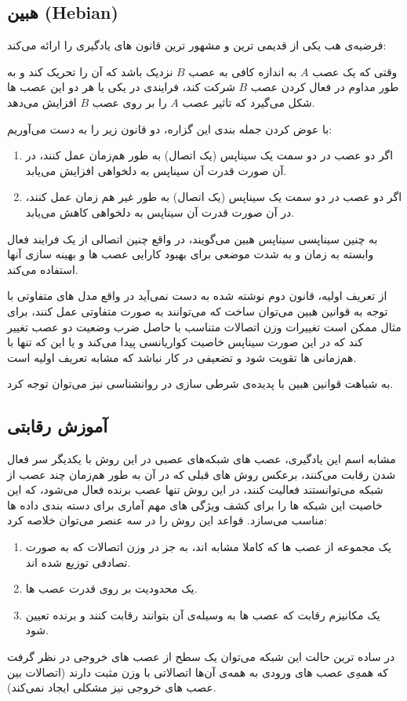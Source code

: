 \documentclass[11pt,a4paper,twocolumn]{article}
\begin{document}
\subsection{هبین (Hebian)}
فرضیه‌ی هب یکی از قدیمی ترین و مشهور ترین قانون های یادگیری را ارائه می‌کند:

وقتی که یک عصب $A$ به اندازه کافی به عصب $B$ نزدیک باشد که آن را تحریک کند و به طور مداوم در فعال کردن عصب $B$ شرکت کند، فرایندی در یکی یا هر دو این عصب ها شکل می‌گیرد که تاثیر عصب $A$ را بر روی عصب $B$ افزایش می‌دهد. \cite[ص-۵۱]{haykin}

با عوض کردن جمله بندی این گزاره، دو قانون زیر را به دست می‌آوریم:
\begin{enumerate}
\item
اگر دو عصب در دو سمت یک سیناپس (یک اتصال) به طور هم‌زمان عمل کنند، در آن صورت قدرت آن سیناپس به دلخواهی افزایش می‌یابد.
\item
اگر دو عصب در دو سمت یک سیناپس (یک اتصال) به طور غیر هم زمان عمل کنند، در آن صورت قدرت آن سیناپس به دلخواهی کاهش می‌یابد. \cite[ص-۵۵]{haykin}
\end{enumerate}
به چنین سیناپسی سیناپس هبین می‌گویند، در واقع چنین اتصالی از یک فرایند فعال وابسته به زمان و به شدت موضعی برای بهبود کارایی عصب ها و بهینه سازی آنها استفاده می‌کند.

از تعریف اولیه، قانون دوم نوشته شده به دست نمی‌آید در واقع مدل های متفاوتی با توجه به قوانین هبین می‌توان ساخت که می‌توانند به صورت متفاوتی عمل کنند، برای مثال ممکن است تغییرات وزن اتصالات متناسب با حاصل ضرب وضعیت دو عصب تغییر کند که در این صورت سیناپس خاصیت کواریانسی پیدا می‌کند و یا این که تنها با هم‌زمانی ها تقویت شود و تضعیفی در کار نباشد که مشابه تعریف اولیه است.

به شباهت قوانین هبین با پدیده‌ی شرطی سازی در روانشناسی نیز می‌توان توجه کرد.

\subsection{آموزش رقابتی}
مشابه اسم این یادگیری، عصب های شبکه‌های عصبی در این روش با یکدیگر سر فعال شدن رقابت می‌کنند، برعکس روش های قبلی که در آن به طور هم‌زمان چند عصب از شبکه می‌توانستند فعالیت کنند، در این روش تنها عصب برنده فعال می‌شود، که این خاصیت این شبکه ها را برای کشف ویژگی های مهم آماری برای دسته بندی داده ها مناسب می‌سازد.
قواعد این روش را در سه عنصر می‌توان خلاصه کرد:
\begin{enumerate}
\item
یک مجموعه از عصب ها که کاملا مشابه اند، به جز در وزن اتصالات که به صورت تصادفی توزیع شده اند.
\item
یک محدودیت بر روی قدرت عصب ها.
\item
یک مکانیزم رقابت که عصب ها به وسیله‌ی آن بتوانند رقابت کنند و برنده تعیین شود.
\end{enumerate}
در ساده ترین حالت این شبکه می‌توان یک سطح از عصب های خروجی در نظر گرفت که همه‌ِی عصب های ورودی به همه‌ی آن‌ها اتصالاتی با وزن مثبت دارند (اتصالات بین عصب های خروجی نیز مشکلی ایجاد نمی‌کند).
\end{document}
